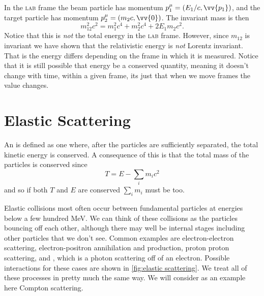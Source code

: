 \documentclass[fleqn]{NotesClass}
\newcommand{\LAB}{\textsc{lab}}
\begin{document}
    In the \LAB{} frame the beam particle has momentum \(p^\mu_1 = (E_1/c, \vv{p_1})\), and the target particle has momentum \(p^\mu_2 = (m_2c, \vv{0})\).
    The invariant mass is then
    \begin{equation}\label{eqn:invariant mass in lab frame}
        m_{12}^2c^2 = m_1^2c^4 + m_2^2c^4 + 2E_1m_2c^2.
    \end{equation}
    Notice that this is \emph{not} the total energy in the \LAB{} frame.
    However, since \(m_{12}\) is invariant we have shown that the relativistic energy is \emph{not} Lorentz invariant.
    That is the energy differs depending on the frame in which it is measured.
    Notice that it is still possible that energy be a conserved quantity, meaning it doesn't change with time, within a given frame, its just that when we move frames the value changes.
    
    \section{Elastic Scattering}
    An  is defined as one where, after the particles are sufficiently separated, the total kinetic energy is conserved.
    A consequence of this is that the total mass of the particles is conserved since
    \begin{equation}
        T = E - \sum_i m_ic^2
    \end{equation}
    and so if both \(T\) and \(E\) are conserved \(\sum_i m_i\) must be too.
    
    Elastic collisions most often occur between fundamental particles at energies below a few hundred \unit{\MeV}.
    We can think of these collisions as the particles bouncing off each other, although there may well be internal stages including other particles that we don't see.
    Common examples are electron-electron scattering, electron-positron annihilation and production, proton proton scattering, and , which is a photon scattering off of an electron.
    Possible interactions for these cases are shown in \cref{fig:elastic scattering}.
    We treat all of these processes in pretty much the same way.
    We will consider as an example here Compton scattering.
    
\end{document}
